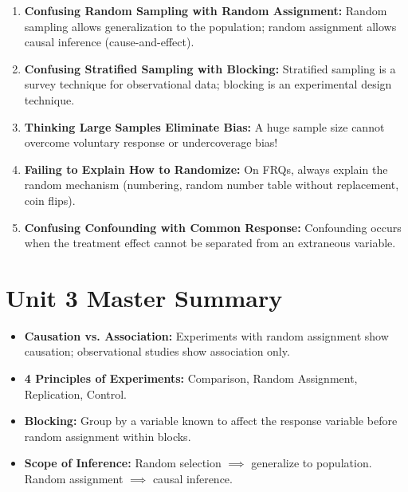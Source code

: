 \begin{trapbox}
\begin{enumerate}[leftmargin=1.2em]
  \item \textbf{Confusing Random Sampling with Random Assignment:} Random sampling allows generalization to the population; random assignment allows causal inference (cause-and-effect).
  \item \textbf{Confusing Stratified Sampling with Blocking:} Stratified sampling is a survey technique for observational data; blocking is an experimental design technique.
  \item \textbf{Thinking Large Samples Eliminate Bias:} A huge sample size cannot overcome voluntary response or undercoverage bias!
  \item \textbf{Failing to Explain How to Randomize:} On FRQs, always explain the random mechanism (numbering, random number table without replacement, coin flips).
  \item \textbf{Confusing Confounding with Common Response:} Confounding occurs when the treatment effect cannot be separated from an extraneous variable.
\end{enumerate}
\end{trapbox}
\section{Unit 3 Master Summary}
\begin{lessonbox}
\begin{itemize}[leftmargin=1.2em]
  \item \textbf{Causation vs. Association:} Experiments with random assignment show causation; observational studies show association only.
  \item \textbf{4 Principles of Experiments:} Comparison, Random Assignment, Replication, Control.
  \item \textbf{Blocking:} Group by a variable known to affect the response variable before random assignment within blocks.
  \item \textbf{Scope of Inference:} Random selection $\implies$ generalize to population. Random assignment $\implies$ causal inference.
\end{itemize}
\end{lessonbox}
\clearpage
